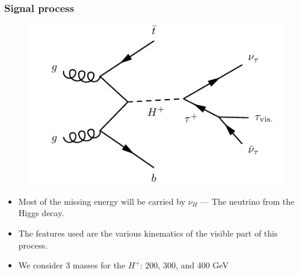 \documentclass[9pt, lualatex]{beamer}
\begin{document}
\begin{frame}
    \frametitle{Signal process}
    \begin{figure}
        \centering
        \includegraphics[width=.5\textwidth]{heavyHplustaunu4fs.pdf}
    \end{figure}

    \begin{itemize}
        \item Most of the missing energy will be carried by $\nu_H$ --- The neutrino from the Higgs decay.
        \item The features used are the various kinematics of the visible part of this process.
        \item We consider 3 masses for the $H^+$: 200, 300, and 400 GeV
    \end{itemize}

\end{frame}
\end{document}
